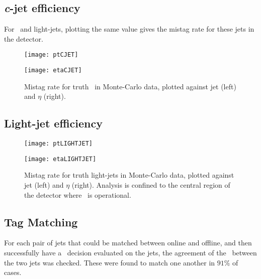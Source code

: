 	\subsection{\textit{c}-jet efficiency}
	For \cjets\, and light-jets, plotting the same value gives the mistag rate for these jets in the detector.

		\begin{figure}[h]
			\centering
			\begin{minipage}[h]{0.48\linewidth}
				\texttt{[image: ptCJET]}

			\end{minipage}
			\quad
			\begin{minipage}[h]{0.48\linewidth}
				\texttt{[image: etaCJET]}
			\end{minipage}
			\caption{Mistag rate for truth \bjets\, in Monte-Carlo data, plotted against jet \pt (left) and $\eta$ (right).}
			\label{fig:MC:cjetefficiency}
		\end{figure}

\newpage
	\subsection{Light-jet efficiency}

		\begin{figure}[h]
			\centering
			\begin{minipage}[h]{0.48\linewidth}
				\texttt{[image: ptLIGHTJET]}

			\end{minipage}
			\quad
			\begin{minipage}[h]{0.48\linewidth}
				\texttt{[image: etaLIGHTJET]}
			\end{minipage}
			\caption{Mistag rate for truth light-jets in Monte-Carlo data, plotted against jet \pt (left) and $\eta$ (right). Analysis is confined to the central region of the detector where \btag\, is operational.}
			\label{fig:MC:lightjetefficiency}
		\end{figure}


	\subsection{Tag Matching}

	For each pair of jets that could be matched between online and offline, and then successfully have a \btag\, decision evaluated on the jets, the agreement of the \btag\, between the two jets was checked. These were found to match one another in $91\%$ of cases.

